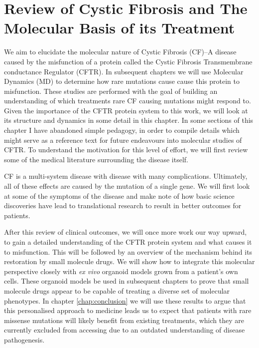 \chapter{Review of Cystic Fibrosis and The Molecular Basis of its Treatment}
\label{chap:cftr}
\newpage





We aim to elucidate the molecular nature of Cystic Fibrosis (CF)--A disease caused by the misfunction of a protein called the Cystic Fibrosis Transmembrane conductance Regulator (CFTR). In subsequent chapters we will use Molecular Dynamics (MD) to determine how rare mutations cause cause this protein to misfunction. These studies are performed with the goal of building an understanding of which treatments rare CF causing mutations might respond to. Given the importance of the CFTR protein system to this work, we will look at its structure and dynamics in some detail in this chapter. In some sections of this chapter I have abandoned simple pedagogy, in order to compile details which might serve as a reference text for future endeavours into molecular studies of CFTR. To understand the motivation for this level of effort, we will first review some of the medical literature surrounding the disease itself. 

CF is a multi-system disease with disease with many complications. Ultimately, all of these effects are caused by the mutation of a single gene. We will first look at some of the symptoms of the disease and make note of how basic science discoveries have lead to translational research to result in better outcomes for patients. 

After this review of clinical outcomes, we will once more work our way upward, to gain a detailed understanding of the CFTR protein system and what causes it to misfunction. This will be followed by an overview of the mechanism behind its restoration by small molecule drugs. We will show how to integrate this molecular perspective closely with \textit {ex vivo} organoid models grown from a patient's own cells. These organoid models be used in subsequent chapters to prove that small molecule drugs appear to be capable of treating a diverse set of molecular phenotypes. In chapter \ref{chap:conclusion} we will use these results to argue that this personalised approach to medicine leads us to expect that patients with rare missense mutations will likely benefit from existing treatments, which they are currently excluded from accessing due to an outdated understanding of disease pathogenesis. 

